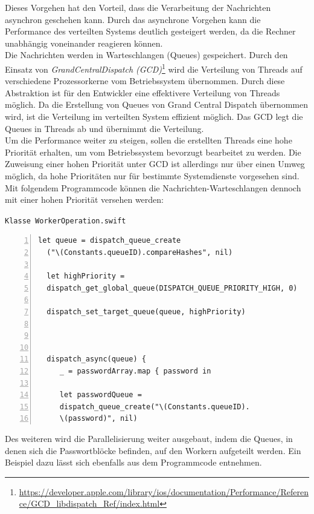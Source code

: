 Dieses Vorgehen hat den Vorteil, dass die Verarbeitung der Nachrichten asynchron geschehen kann. Durch das asynchrone Vorgehen kann die Performance des verteilten Systems deutlich gesteigert werden, da die Rechner unabhängig voneinander reagieren können. \\
Die Nachrichten werden in Warteschlangen (Queues) gespeichert. Durch den Einsatz von \emph{GrandCentralDispatch (GCD)}\footnote{\url{https://developer.apple.com/library/ios/documentation/Performance/Reference/GCD_libdispatch_Ref/index.html}} wird die Verteilung von Threads auf verschiedene Prozessorkerne vom Betriebssystem übernommen. Durch diese Abstraktion ist für den Entwickler eine effektivere Verteilung von Threads möglich. Da die Erstellung von Queues von Grand Central Dispatch übernommen wird, ist die Verteilung im verteilten System effizient möglich. Das GCD legt die Queues in Threads ab und übernimmt die Verteilung. \\
Um die Performance weiter zu steigen, sollen die erstellten Threads eine hohe Priorität erhalten, um vom Betriebssystem bevorzugt bearbeitet zu werden. Die Zuweisung einer hohen Priorität unter GCD ist allerdings nur über einen Umweg möglich, da hohe Prioritäten nur für bestimmte Systemdienste vorgesehen sind. Mit folgendem Programmcode können die Nachrichten-Warteschlangen dennoch mit einer hohen Priorität versehen werden:


\texttt{Klasse WorkerOperation.swift}
\begin{lstlisting}[basicstyle=\ttfamily,numbers=left,numberstyle=\footnotesize\ttfamily,backgroundcolor=\color{sourcegray}]
  let queue = dispatch_queue_create
  ("\(Constants.queueID).compareHashes", nil)
  
  let highPriority = 
  dispatch_get_global_queue(DISPATCH_QUEUE_PRIORITY_HIGH, 0)
  
  dispatch_set_target_queue(queue, highPriority)
  
  
  
  dispatch_async(queue) {
     _ = passwordArray.map { password in
     
     let passwordQueue = 
     dispatch_queue_create("\(Constants.queueID).
     \(password)", nil)
\end{lstlisting}

Des weiteren wird die Parallelisierung weiter ausgebaut, indem die Queues, in denen sich die Passwortblöcke befinden, auf den Workern aufgeteilt werden. Ein Beispiel dazu lässt sich ebenfalls aus dem Programmcode entnehmen. \\

